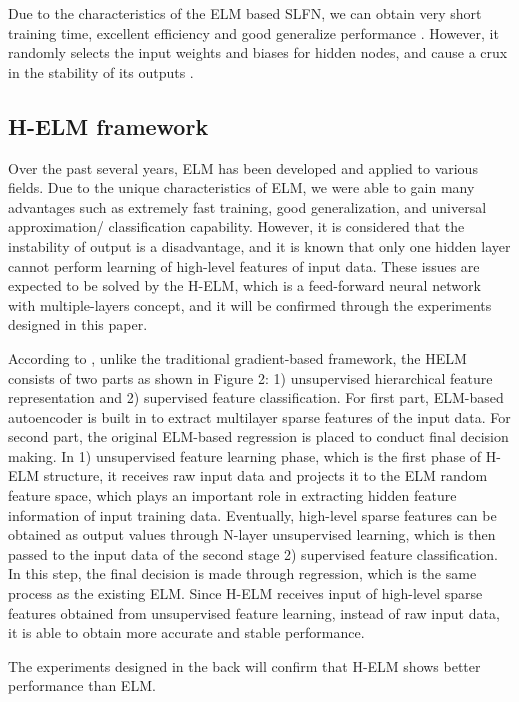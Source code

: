 \documentclass[runningheads,a4paper]{llncs}
\begin{document}
Due to the characteristics of the ELM based SLFN, we can obtain very short training time, excellent efficiency and good generalize performance \cite{elm_better_than_ann}. However, it randomly selects the input weights and biases for hidden nodes, and cause a crux in the stability of its outputs \cite{ensemble_elm}. 

\subsection{H-ELM framework}

Over the past several years, ELM has been developed and applied to various fields. Due to the unique characteristics of ELM, we were able to gain many advantages such as extremely fast training, good generalization, and universal approximation/ classification capability. However, it is considered that the instability of output is a disadvantage, and it is known that only one hidden layer cannot perform learning of high-level features of input data. These issues are expected to be solved by the H-ELM, which is a feed-forward neural network with multiple-layers concept, and it will be confirmed through the experiments designed in this paper.

According to \cite{helm}, unlike the traditional gradient-based framework, the HELM consists of two parts as shown in Figure 2: 1) unsupervised hierarchical feature representation and 2) supervised feature classification. For first part, ELM-based autoencoder is built in to extract multilayer sparse features of the input data. For second part, the original ELM-based regression is placed to conduct final decision making. In 1) unsupervised feature learning phase, which is the first phase of H-ELM structure, it receives raw input data and projects it to the ELM random feature space, which plays an important role in extracting hidden feature information of input training data. Eventually, high-level sparse features can be obtained as output values through N-layer unsupervised learning, which is then passed to the input data of the second stage 2) supervised feature classification. In this step, the final decision is made through regression, which is the same process as the existing ELM. Since H-ELM receives input of high-level sparse features obtained from unsupervised feature learning, instead of raw input data, it is able to obtain more accurate and stable performance.

The experiments designed in the back will confirm that H-ELM shows better performance than ELM.
\end{document}
